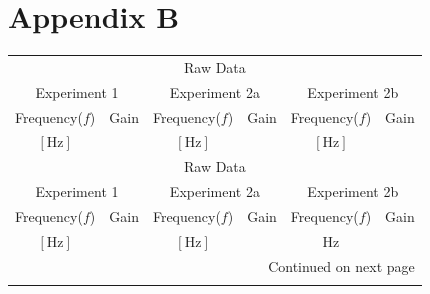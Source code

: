 \documentclass[
	12pt,
	]{article}
\theoremstyle{definition}
\theoremstyle{definition}
\theoremstyle{definition}
\theoremstyle{definition}
\theoremstyle{definition}
\theoremstyle{example}
\theoremstyle{note}
\theoremstyle{remark}
\theoremstyle{example}
\begin{document}
		\section*{Appendix B }
		\begin{longtable}{cccccc}
				\toprule
				\toprule
				\multicolumn{6}{c}{Raw Data} \\
				\multicolumn{2}{c}{Experiment 1} & \multicolumn{2}{c}{Experiment 2a} & 
				\multicolumn{2}{c}{Experiment 2b}\\
				\cmidrule(lr){1-2} \cmidrule(l){3-4}\cmidrule(l){5-6}
				Frequency($f$) & Gain &
				Frequency($f$) & Gain & Frequency($f$) & Gain\\
				$[\si{\hertz}]$ & & $[\si{\hertz}]$ & & $[\si{\hertz}]$&  \\
				\endfirsthead
				\multicolumn{6}{c}{Raw Data} \\\multicolumn{2}{c}{Experiment 1} & \multicolumn{2}{c}{Experiment 2a} & 
				\multicolumn{2}{c}{Experiment 2b}\\
				\cmidrule(lr){1-2} \cmidrule(l){3-4}\cmidrule(l){5-6}
				Frequency($f$) & Gain &
				Frequency($f$) & Gain & Frequency($f$) & Gain\\
				$[\si{\hertz}]$ & & $[\si{\hertz}]$ & & $\si{\hertz}$&  \\
				\endhead
				\hline \multicolumn{6}{|r|}{{Continued on next page}} \\ \hline
				\endfoot
				
				\hline \hline
				\endlastfoot
				

\end{longtable}
\end{document}
